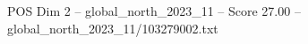 \begin{textsample}{POS Dim 2 – global\_north\_2023\_11 – Score 27.00 – global\_north\_2023\_11/103279002.txt}
\end{textsample}

